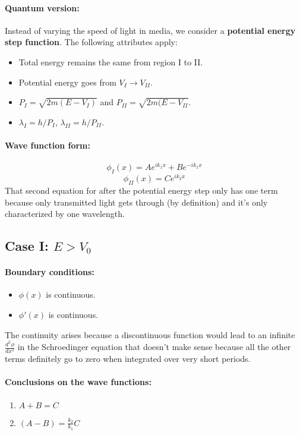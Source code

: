 \documentclass[a4paper,12pt]{report}
\begin{document}
\paragraph{Quantum version: } Instead of varying the speed of light in media, we consider a \textbf{potential energy step function}. The following attributes apply:
\begin{itemize}
\item Total energy remains the same from region I to II.
\item Potential energy goes from $V_{I} \to V_{II}$.
\item $P_I = \sqrt{2m(E-V_I)}$ and $P_{II} = \sqrt{2m(E-V_{II}}$.
\item $\lambda_I = h/P_I$, $\lambda_{II} = h/P_{II}$.
\end{itemize}

\paragraph{Wave function form: }
$$\phi_I(x) = Ae^{ik_1x} + Be^{-ik_1x}$$
$$\phi_{II}(x) = Ce^{ik_2x}$$
That second equation for after the potential energy step only has one term because only transmitted light gets through (by definition) and it's only characterized by one wavelength.

\subsection{Case I: $E > V_0$}

\paragraph{Boundary conditions: }
\begin{itemize}
\item $\phi(x)$ is continuous.
\item $\phi'(x)$ is continuous.
\end{itemize}

The continuity arises because a discontinuous function would lead to an infinite $\frac{d^2\phi}{dx^2}$ in the Schroedinger equation that doesn't make sense because all the other terms definitely go to zero when integrated over very short periods.

\paragraph{Conclusions on the wave functions: } 
\begin{enumerate}
\item $A + B = C$
\item $(A-B) = \frac{k_2}{k_1}C$
\end{enumerate}
\end{document}
